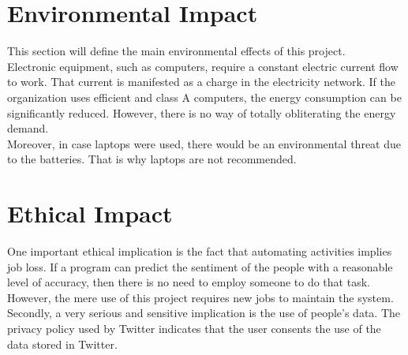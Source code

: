 \section{Environmental Impact}
This section will define the main environmental effects of this project.\\
Electronic equipment, such as computers, require a constant electric current flow to work. That current is manifested as a charge in the electricity network. If the organization uses efficient and class A computers, the energy consumption can be significantly reduced. However, there is no way of totally obliterating the energy demand.\\ Moreover, in case laptops were used, there would be an environmental threat due to the batteries. That is why laptops are not recommended.
\section{Ethical Impact}
One important ethical implication is the fact that automating activities implies job loss. If a program can predict the sentiment of the people with a reasonable level of accuracy, then there is no need to employ someone to do that task. However, the mere use of this project requires new jobs to maintain the system.\\
Secondly, a very serious and sensitive implication is the use of people's data. The privacy policy used by Twitter indicates that the user consents the use of the data stored in Twitter. 


